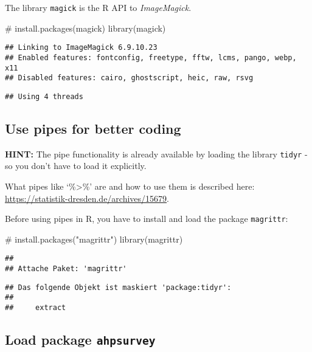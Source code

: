 \documentclass[
]{article}
\newenvironment{Shaded}{\begin{snugshade}}{\end{snugshade}}
\newcommand{\CommentTok}[1]{\textcolor[rgb]{0.54,0.53,0.53}{#1}}
\newcommand{\FunctionTok}[1]{\textcolor[rgb]{0.39,0.29,0.61}{#1}}
\newcommand{\NormalTok}[1]{\textcolor[rgb]{0.12,0.11,0.11}{#1}}
\begin{document}
The library \texttt{magick} is the R API to \emph{ImageMagick}.

\begin{Shaded}
\begin{Highlighting}[]
\CommentTok{\# install.packages(\textquotesingle{}magick\textquotesingle{})}
\FunctionTok{library}\NormalTok{(magick)}
\end{Highlighting}
\end{Shaded}

\begin{verbatim}
## Linking to ImageMagick 6.9.10.23
## Enabled features: fontconfig, freetype, fftw, lcms, pango, webp, x11
## Disabled features: cairo, ghostscript, heic, raw, rsvg
\end{verbatim}

\begin{verbatim}
## Using 4 threads
\end{verbatim}

\hypertarget{use-pipes-for-better-coding}{%
\subsection{Use pipes for better
coding}\label{use-pipes-for-better-coding}}

\textbf{HINT:} The pipe functionality is already available by loading
the library \texttt{tidyr} - so you don't have to load it explicitly.

What pipes like `\%\textgreater\%' are and how to use them is described
here: \url{https://statistik-dresden.de/archives/15679}.

Before using pipes in R, you have to install and load the package
\texttt{magrittr}:

\begin{Shaded}
\begin{Highlighting}[]
\CommentTok{\# install.packages("magrittr")}
\FunctionTok{library}\NormalTok{(magrittr)}
\end{Highlighting}
\end{Shaded}

\begin{verbatim}
## 
## Attache Paket: 'magrittr'
\end{verbatim}

\begin{verbatim}
## Das folgende Objekt ist maskiert 'package:tidyr':
## 
##     extract
\end{verbatim}

\hypertarget{load-package-ahpsurvey}{%
\subsection{\texorpdfstring{Load package
\texttt{ahpsurvey}}{Load package ahpsurvey}}\label{load-package-ahpsurvey}}
\end{document}
